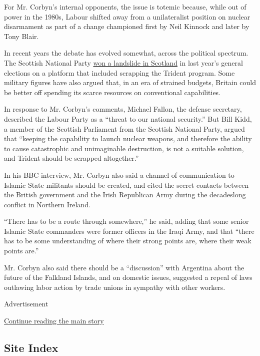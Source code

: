 For Mr. Corbyn's internal opponents, the issue is totemic because, while
out of power in the 1980s, Labour shifted away from a unilateralist
position on nuclear disarmament as part of a change championed first by
Neil Kinnock and later by Tony Blair.

In recent years the debate has evolved somewhat, across the political
spectrum. The Scottish National Party
\href{http://www.nytimes.com/2015/05/09/world/europe/david-cameron-and-conservatives-emerge-victorious-in-british-election.html}{won
a landslide in Scotland} in last year's general elections on a platform
that included scrapping the Trident program. Some military figures have
also argued that, in an era of strained budgets, Britain could be better
off spending its scarce resources on conventional capabilities.

In response to Mr. Corbyn's comments, Michael Fallon, the defense
secretary, described the Labour Party as a ``threat to our national
security.'' But Bill Kidd, a member of the Scottish Parliament from the
Scottish National Party, argued that ``keeping the capability to launch
nuclear weapons, and therefore the ability to cause catastrophic and
unimaginable destruction, is not a suitable solution, and Trident should
be scrapped altogether.''

In his BBC interview, Mr. Corbyn also said a channel of communication to
Islamic State militants should be created, and cited the secret contacts
between the British government and the Irish Republican Army during the
decadeslong conflict in Northern Ireland.

``There has to be a route through somewhere,'' he said, adding that some
senior Islamic State commanders were former officers in the Iraqi Army,
and that ``there has to be some understanding of where their strong
points are, where their weak points are.''

Mr. Corbyn also said there should be a ``discussion'' with Argentina
about the future of the Falkland Islands, and on domestic issues,
suggested a repeal of laws outlawing labor action by trade unions in
sympathy with other workers.

Advertisement

\protect\hyperlink{after-bottom}{Continue reading the main story}

\hypertarget{site-index}{%
\subsection{Site Index}\label{site-index}}

